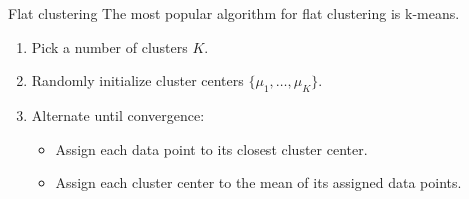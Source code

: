 \documentclass[10pt, compress]{beamer}
\begin{document}
\begin{frame}{Flat clustering}
  The most popular algorithm for flat clustering is \alert{k-means}.
  \begin{enumerate}
    \item<2-> Pick a number of clusters $K$.
    \item<3-> Randomly initialize cluster centers $\{\mu_1, \ldots, \mu_K\}$.
    \item<4-> Alternate until convergence:
      \begin{itemize}
        \item Assign each data point to its closest cluster center.
        \item Assign each cluster center to the mean of its assigned data points.
      \end{itemize}
  \end{enumerate}

\end{frame}

\end{document}
